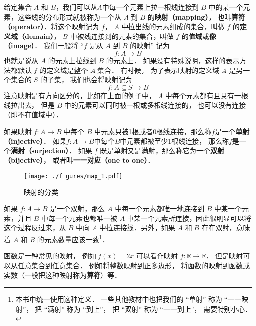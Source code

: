 

给定集合 $A$ 和 $B$，我们可以从$A$中每一个元素上拉一根线连接到 $B$ 中的某一个元素，这些线的分布形式就被称为一个从 $A$ 到 $B$ 的\textbf{映射（mapping）}， 也叫\textbf{算符（operator）}．将这个映射记为 $f$， $A$ 中拉出线的元素组成的集合，叫做 $f$ 的\textbf{定义域（domain）}， $B$ 中被线连接到的元素的集合，叫做 $f$ 的\textbf{值域}或\textbf{像（image）}． 我们一般将 “$f$ 是从 $A$ 到 $B$ 的映射” 记为
\begin{equation}
f:A\to B
\end{equation}
也就是说从 $A$ 的元素上拉线到 $B$ 的元素上． 如果没有特殊说明，这样的表示方法都默认 $f$ 的定义域是整个 $A$ 集合． 有时候， 为了表示映射的定义域 $A$ 是另一个集合的 $S$ 的子集， 我们也会将映射记为
\begin{equation}
f: A\subseteq S \to B
\end{equation}
注意映射是有方向区分的，比如在上面的例子中， $A$ 中每个元素都有且只有一根线拉出去， 但是 $B$ 中的元素可以同时被一根或多根线连接的， 也可以没有连接（即不在值域中）．

如果映射 $f:A \to B$ 中每个 $B$ 中元素只被1根或者0根线连接，那么称$f$是一个\textbf{单射（injective）}． 如果$f:A→ B$中每个$B$中元素都被至少1根线连接， 那么称$f$是一个\textbf{满射（surjection）}． 如果 $f$ 既是单射又是满射，那么称它为一个\textbf{双射（bijective）}， 或者叫\textbf{一一对应（one to one）}．


\begin{figure}[ht]
\centering
\texttt{[image: ./figures/map\_1.pdf]}
\caption{映射的分类} \label{map_fig1}
\end{figure}

如果 $f:A\to B$ 是一个双射，那么 $A$ 中每一个元素都唯一地连接到 $B$ 中某一个元素，并且 $B$ 中每一个元素也都唯一被 $A$ 中某一个元素所连接，因此很明显可以将这个过程反过来，从 $B$ 中向 $A$ 中拉连接线．另外，如果 $A$ 和 $B$ 存在双射，意味着 $A$ 和 $B$ 的元素数量应该一致\footnote{本书中统一使用这种定义． 一些其他教材中也把我们的 “单射” 称为 “一一映射”， 把 “满射” 称为 “到上”， 把 “双射” 称为 “一一到上”， 需要特别小心．}．

函数是一种常见的映射， 例如 $f(x) = 2x$ 可以看作映射 $f: \mathbb R \to \mathbb R$． 但是映射可以从任意集合到任意集合． 例如将整数映射到正多边形， 将函数的映射到函数或实数（一般把这种映射称为\textbf{算符}）等．

